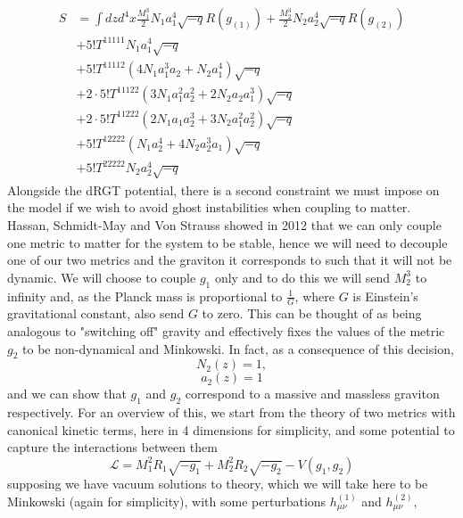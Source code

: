 \documentclass[11pt]{report}
\numberwithin{equation}{chapter}
\begin{document}
\begin{align}
    S&=\int dzd^4x\frac{M_1^{3}}{2}N_1a_1^4\sqrt{-q}R(g_{(1)})+ \frac{M_2^{3}}{2}N_2a_2^4\sqrt{-q}R(g_{(2)})\\ \nonumber
    &+5!T^{11111}N_1a_1^4\sqrt{-q}\\ \nonumber
    &+5!T^{11112}\left(4N_1a_1^3a_2+N_2a_1^4\right)\sqrt{-q}\\ \nonumber
    &+2\cdot5!T^{11122}\left(3N_1a_1^2a_2^2+2N_2a_2a_1^3\right)\sqrt{-q}\\ \nonumber
    &+2\cdot5!T^{11222}\left(2N_1a_1a^3_2+3N_2a_1^2a_2^2\right)\sqrt{-q}\\ \nonumber
    &+5!T^{12222}\left(N_1a_2^4+4N_2a_2^3a_1\right)\sqrt{-q}\\ \nonumber
    &+5!T^{22222}N_2a_2^4\sqrt{-q} 
\end{align}
 Alongside the dRGT potential, there is a second constraint we must impose on the model if we wish to avoid ghost instabilities when coupling to matter. Hassan, Schmidt-May and Von Strauss showed in 2012 that we can only couple one metric to matter for the system to be stable\cite{Hassan:2012wr}, hence we will need to decouple one of our two metrics and the graviton it corresponds to such that it will not be dynamic. We will choose to couple $g_1$ only and to do this we will send $M_2^{3}$ to infinity and, as the Planck mass is proportional to $\frac{1}{G}$, where $G$ is Einstein's gravitational constant, also send $G$ to zero. This can be thought of as being analogous to "switching off" gravity and effectively fixes the values of the metric $g_2$ to be non-dynamical and Minkowski. In fact, as a consequence of this decision,
\begin{equation}
    N_2\left(z\right)=1,
\end{equation}
\begin{equation}
    a_2\left(z\right)=1
\end{equation}
and we can show that $g_1$ and $g_2$ correspond to a massive and massless graviton respectively\cite{Kurts_review}. For an overview of this, we start from the theory of two metrics with canonical kinetic terms, here in 4 dimensions for simplicity, and some potential to capture the interactions between them
\begin{equation}
    \mathcal{L}=M_1^2 R_1\sqrt{-g_1}+M_2^2 R_2\sqrt{-g_2} - V\left(g_1,g_2\right)
\end{equation}
supposing we have vacuum solutions to theory, which we will take here to be Minkowski (again for simplicity), with some perturbations $h_{\mu\nu}^{(1)}$ and $h_{\mu\nu}^{(2)}$,
\end{document}
